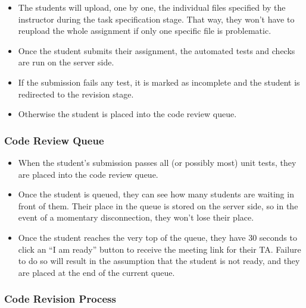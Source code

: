 \documentclass[a4paper, 12pt]{article}
\begin{document}
    \begin{itemize}
      \item The students will upload, one by one, the individual files specified by the instructor during the task specification
      stage. That way, they won't have to reupload the whole assignment if only one specific file is problematic.
      \item Once the student submits their assignment, the automated tests and checks are run on the server side.
      \item If the submission fails any test, it is marked as incomplete and the student is redirected to the revision stage.
      \item Otherwise the student is placed into the code review queue.
    \end{itemize}

    \subsubsection{Code Review Queue}

    \begin{itemize}

      \item When the student's submission passes all (or possibly most) unit tests, they are placed into the code review queue.
      \item Once the student is queued, they can see how many students are waiting in front of them. Their place in the queue is
      stored on the server side, so in the event of a momentary disconnection, they won't lose their place.
      \item Once the student reaches the very top of the queue, they have 30 seconds to click an ``I am ready''
      button to receive the meeting link for their TA. Failure to do so will result in the assumption that the student is not ready, and they
      are placed at the end of the current queue.
    \end{itemize}

    \subsubsection{Code Revision Process}
\end{document}
